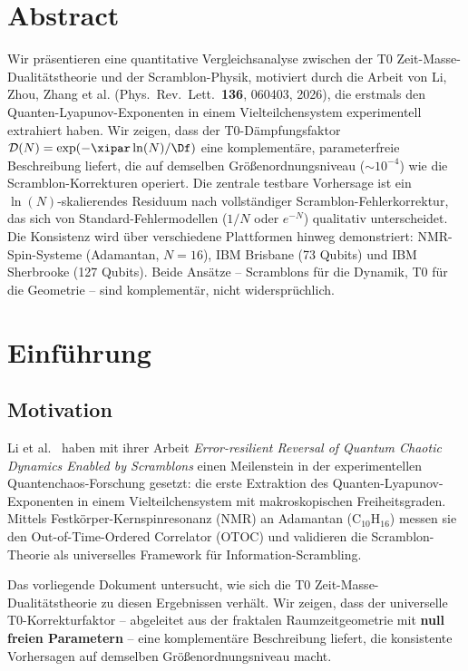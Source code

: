 \section*{Abstract}
Wir präsentieren eine quantitative Vergleichsanalyse zwischen der T0 Zeit-Masse-Dualitätstheorie und der Scramblon-Physik, motiviert durch die Arbeit von Li, Zhou, Zhang et al. (Phys.\ Rev.\ Lett.\ \textbf{136}, 060403, 2026), die erstmals den Quanten-Lyapunov-Exponenten in einem Vielteilchensystem experimentell extrahiert haben. Wir zeigen, dass der T0-Dämpfungsfaktor $\mathcal{D}(N) = \exp(-\xipar \ln(N)/\Df)$ eine komplementäre, parameterfreie Beschreibung liefert, die auf demselben Größenordnungsniveau ($\sim 10^{-4}$) wie die Scramblon-Korrekturen operiert. Die zentrale testbare Vorhersage ist ein $\ln(N)$-skalierendes Residuum nach vollständiger Scramblon-Fehlerkorrektur, das sich von Standard-Fehlermodellen ($1/N$ oder $e^{-N}$) qualitativ unterscheidet. Die Konsistenz wird über verschiedene Plattformen hinweg demonstriert: NMR-Spin-Systeme (Adamantan, $N=16$), IBM Brisbane (73 Qubits) und IBM Sherbrooke (127 Qubits). Beide Ansätze -- Scramblons für die Dynamik, T0 für die Geometrie -- sind komplementär, nicht widersprüchlich.

\clearpage

\section{Einführung}
\label{sec:intro}

\subsection{Motivation}

Li et al.\ \cite{li_scramblons_2026} haben mit ihrer Arbeit \emph{Error-resilient Reversal of Quantum Chaotic Dynamics Enabled by Scramblons} einen Meilenstein in der experimentellen Quantenchaos-Forschung gesetzt: die erste Extraktion des Quanten-Lyapunov-Exponenten in einem Vielteilchensystem mit makroskopischen Freiheitsgraden. Mittels Festkörper-Kernspinresonanz (NMR) an Adamantan (C$_{10}$H$_{16}$) messen sie den Out-of-Time-Ordered Correlator (OTOC) und validieren die Scramblon-Theorie als universelles Framework für Information-Scrambling.

Das vorliegende Dokument untersucht, wie sich die T0 Zeit-Masse-Dualitätstheorie \cite{pascher_t0_2025} zu diesen Ergebnissen verhält. Wir zeigen, dass der universelle T0-Korrekturfaktor -- abgeleitet aus der fraktalen Raumzeitgeometrie mit \textbf{null freien Parametern} -- eine komplementäre Beschreibung liefert, die konsistente Vorhersagen auf demselben Größenordnungsniveau macht.

